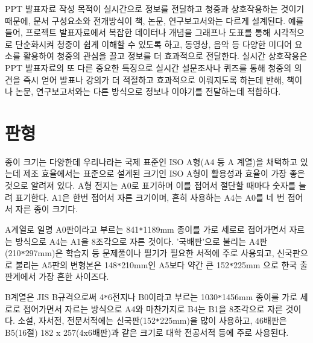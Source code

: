 \documentclass[
  letterpaper,
]{book}
\begin{document}
PPT 발표자료 작성 목적이 실시간으로 정보를 전달하고 청중과 상호작용하는
것이기 때문에, 문서 구성요소와 전개방식이 책, 논문, 연구보고서와는
다르게 설계된다. 예를 들어, 프로젝트 발표자료에서 복잡한 데이터나 개념을
그래프나 도표를 통해 시각적으로 단순화시켜 청중이 쉽게 이해할 수 있도록
하고, 동영상, 음악 등 다양한 미디어 요소를 활용하여 청중의 관심을 끌고
정보를 더 효과적으로 전달한다. 실시간 상호작용은 PPT 발표자료의 또 다른
중요한 특징으로 실시간 설문조사나 퀴즈를 통해 청중의 의견을 즉시 얻어
발표나 강의가 더 적절하고 효과적으로 이뤄지도록 하는데 반해, 책이나
논문, 연구보고서와는 다른 방식으로 정보나 이야기를 전달하는데 적합하다.

\hypertarget{uxd310uxd615}{%
\section{판형}\label{uxd310uxd615}}

종이 크기는 다양한데 우리나라는 국제 표준인 ISO A형(A4 등 A 계열)을
채택하고 있는데 제조 효율에서는 표준으로 설계된 크기인 ISO A형이
활용성과 효율이 가장 좋은 것으로 알려져 있다. A형 전지는 A0로 표기하며
이를 접어서 절단할 때마다 숫자를 늘려 표기한다. A1은 한번 접어서 자른
크기이며, 흔히 사용하는 A4는 A0를 네 번 접어서 자른 종이 크기다.

A계열로 일명 A0판이라고 부르는 841\texttt{*}1189mm 종이를 가로 세로로
접어가면서 자르는 방식으로 A4는 A1을 8조각으로 자른 것이다. '국배판'으로
불리는 A4판(210\texttt{*}297mm)은 학습지 등 문제풀이나 필기가 필요한
서적에 주로 사용되고, 신국판으로 불리는 A5판의 변형본은
148\texttt{*}210mm인 A5보다 약간 큰 152\texttt{*}225mm 으로 한국
출판계에서 가장 흔한 사이즈다.

B계열은 JIS B규격으로써 4\texttt{*}6전지나 B0이라고 부르는
1030\texttt{*}1456mm 종이를 가로 세로로 접어가면서 자르는 방식으로 A4와
마찬가지로 B4는 B1을 8조각으로 자른 것이다. 소설, 자서전, 전문서적에는
신국판(152\texttt{*}225mm)을 많이 사용하고, 46배판은 B5(16절) 182 x
257(4x6배판)과 같은 크기로 대학 전공서적 등에 주로 사용된다.
\end{document}
